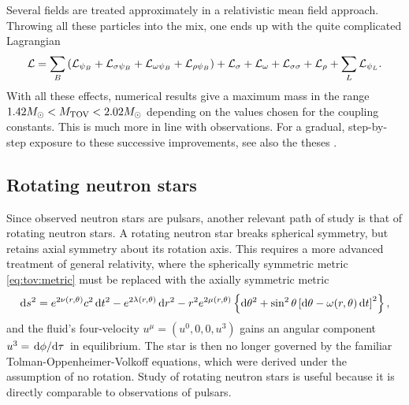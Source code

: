 Several fields are treated approximately in a relativistic mean field approach.
Throwing all these particles into the mix, one ends up with the quite complicated Lagrangian
\begin{equation*}
\begin{split}
	\mathcal{L} &= \sum_B \left( \mathcal{L}_{\psi_B} + \mathcal{L}_{\sigma \psi_{B}} + \mathcal{L}_{\omega \psi_{B}} + \mathcal{L}_{\rho \psi_{B}} \right) + \mathcal{L}_\sigma + \mathcal{L}_\omega + \mathcal{L}_{\sigma \sigma} + \mathcal{L}_\rho + \sum_L \mathcal{L}_{\psi_L} . \\
\end{split}
\end{equation*}
With all these effects, numerical results give a maximum mass in the range $1.42 M_\odot < M_\text{TOV} < 2.02 M_\odot$ depending on the values chosen for the coupling constants. \cite[table 1]{ref:neutron_star_hyperon_effect}
This is much more in line with observations.
For a gradual, step-by-step exposure to these successive improvements, see also the theses \cite{ref:master_caroline,ref:master_francesco}.

\subsection*{Rotating neutron stars}

Since observed neutron stars are pulsars, another relevant path of study is that of rotating neutron stars.
A rotating neutron star breaks spherical symmetry, but retains axial symmetry about its rotation axis.
This requires a more advanced treatment of general relativity, where the spherically symmetric metric \eqref{eq:tov:metric} must be replaced with the axially symmetric metric
\cite[section 6]{ref:glendenning}
\begin{equation*}
	\mathop{}\!\mathrm{d} s^2 = e^{2\nu(r,\theta)} c^2 \mathop{}\!\mathrm{d} t^2 - e^{2\lambda(r,\theta)} \mathop{}\!\mathrm{d} r^2 - r^2 e^{2 \mu(r,\theta)} \left\{ \mathop{}\!\mathrm{d} \theta^2 + \sin^2 \theta \left[ \mathop{}\!\mathrm{d} \theta  - \omega(r,\theta) \mathop{}\!\mathrm{d} t \right]^2 \right\} ,
\end{equation*}
and the fluid's four-velocity $u^\mu = (u^0, 0, 0, u^3)$ gains an angular component $u^3 = \odv{\phi}/{\tau}$ in equilibrium.
The star is then no longer governed by the familiar Tolman-Oppenheimer-Volkoff equations, which were derived under the assumption of no rotation.
Study of rotating neutron stars is useful because it is directly comparable to observations of pulsars.

